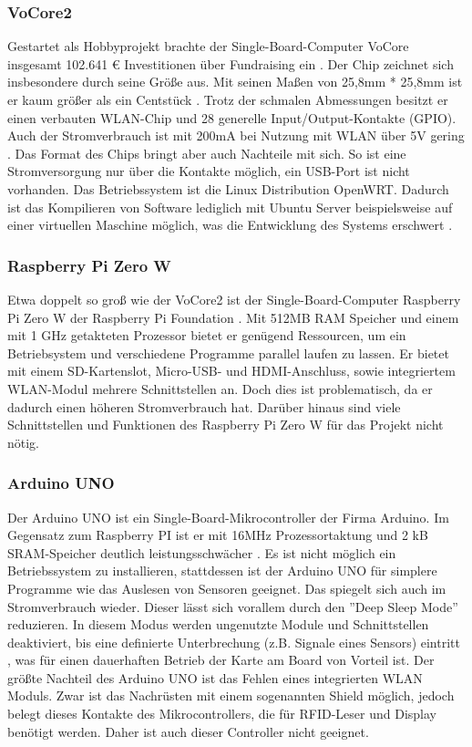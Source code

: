 \documentclass[12pt,titlepage]{scrartcl}
\begin{document}
			\subsubsection{VoCore2}
			Gestartet als Hobbyprojekt brachte der Single-Board-Computer VoCore insgesamt 102.641 \euro{} Investitionen über Fundraising ein \cite{vocorefundraising}. Der Chip zeichnet sich insbesondere durch seine Größe aus. Mit seinen Maßen von 25,8mm * 25,8mm ist er kaum größer als ein Centstück \cite{vocoregeneral}. Trotz der schmalen Abmessungen besitzt er einen verbauten WLAN-Chip und 28 generelle Input/Output-Kontakte (GPIO). Auch der Stromverbrauch ist mit 200mA bei Nutzung mit WLAN über 5V gering \cite{vocorepower}. Das Format des Chips bringt aber auch Nachteile mit sich. So ist eine Stromversorgung nur über die Kontakte möglich, ein USB-Port ist nicht vorhanden. Das Betriebssystem ist die Linux Distribution OpenWRT. Dadurch ist das Kompilieren von Software lediglich mit Ubuntu Server beispielsweise auf einer virtuellen Maschine möglich, was die Entwicklung des Systems erschwert \cite{vocorecompile}.
			\subsubsection{Raspberry Pi Zero W}
			Etwa doppelt so groß wie der VoCore2 ist der Single-Board-Computer Raspberry Pi Zero W der Raspberry Pi Foundation \cite{pizerowgeneral}. Mit 512MB RAM Speicher und einem mit 1 GHz getakteten Prozessor bietet er genügend Ressourcen, um ein Betriebsystem und verschiedene Programme parallel laufen zu lassen. Er bietet mit einem SD-Kartenslot, Micro-USB- und HDMI-Anschluss, sowie integriertem WLAN-Modul mehrere Schnittstellen an. Doch dies ist problematisch, da er dadurch einen höheren Stromverbrauch hat. Darüber hinaus sind viele Schnittstellen und Funktionen des Raspberry Pi Zero W für das Projekt nicht nötig.
			\subsubsection{Arduino UNO} \label{uno}
			Der Arduino UNO ist ein Single-Board-Mikrocontroller der Firma Arduino. Im Gegensatz zum Raspberry PI ist er mit 16MHz Prozessortaktung und 2 kB SRAM-Speicher deutlich leistungsschwächer \cite{arduinounogeneral}. Es ist nicht möglich ein Betriebssystem zu installieren, stattdessen ist der Arduino UNO für simplere Programme wie das Auslesen von Sensoren geeignet. Das spiegelt sich auch im Stromverbrauch wieder. Dieser lässt sich vorallem durch den ''Deep Sleep Mode'' reduzieren. In diesem Modus werden ungenutzte Module und Schnittstellen deaktiviert, bis eine definierte Unterbrechung (z.B. Signale eines Sensors) eintritt \cite{arduinounosleep}, was für einen dauerhaften Betrieb der Karte am Board von Vorteil ist. Der größte Nachteil des Arduino UNO ist das Fehlen eines integrierten WLAN Moduls. Zwar ist das Nachrüsten mit einem sogenannten Shield möglich, jedoch belegt dieses Kontakte des Mikrocontrollers, die für RFID-Leser und Display benötigt werden. Daher ist auch dieser Controller nicht geeignet.			
\end{document}
